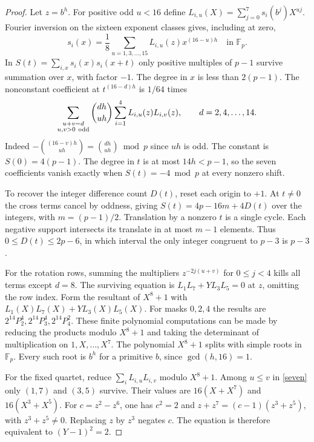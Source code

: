 \documentclass[11pt]{article}
\newcommand{\F}{\mathbb F}
\begin{document}
\begin{proof}
Let $z=b^h$. For positive odd $u<16$ define $L_{i,u}(X)=\sum_{j=0}^7 s_i(b^j)X^{uj}$. Fourier inversion on the sixteen exponent classes gives, including at zero,
\[
 s_i(x)=\frac18\sum_{u=1,3,\ldots,15} L_{i,u}(z)x^{(16-u)h}\quad\text{in }\F_p.
\]
In $S(t)=\sum_{i,x}s_i(x)s_i(x+t)$ only positive multiples of $p-1$ survive summation over $x$, with factor $-1$. The degree in $x$ is less than $2(p-1)$. The nonconstant coefficient at $t^{(16-d)h}$ is $1/64$ times
\begin{equation}\label{seven}
 \sum_{\substack{u+v=d\\ u,v>0\ {\rm odd}}}\binom{dh}{uh}
               \sum_{i=1}^4 L_{i,u}(z)L_{i,v}(z),\qquad d=2,4,\ldots,14.
\end{equation}
Indeed $-\binom{(16-v)h}{uh}=\binom{dh}{uh}\bmod p$ since $uh$ is odd. The constant is $S(0)=4(p-1)$. The degree in $t$ is at most $14h<p-1$, so the seven coefficients vanish exactly when $S(t)=-4\bmod p$ at every nonzero shift.

To recover the integer difference count $D(t)$, reset each origin to $+1$. At $t\ne0$ the cross terms cancel by oddness, giving $S(t)=4p-16m+4D(t)$ over the integers, with $m=(p-1)/2$. Translation by a nonzero $t$ is a single cycle. Each negative support intersects its translate in at most $m-1$ elements. Thus $0\le D(t)\le2p-6$, in which interval the only integer congruent to $p-3$ is $p-3$.

For the rotation rows, summing the multipliers $z^{-2j(u+v)}$ for $0\le j<4$ kills all terms except $d=8$. The surviving equation is $L_1L_7+Y L_3L_5=0$ at $z$, omitting the row index. Form the resultant of $X^8+1$ with $L_1(X)L_7(X)+Y L_3(X)L_5(X)$. For masks $0,2,4$ the results are $2^{14}P_2^4,2^{14}P_3^4,2^{14}P_4^2$. These finite polynomial computations can be made by reducing the products modulo $X^8+1$ and taking the determinant of multiplication on $1,X,\ldots,X^7$. The polynomial $X^8+1$ splits with simple roots in $\F_p$. Every such root is $b^h$ for a primitive $b$, since $\gcd(h,16)=1$.

For the fixed quartet, reduce $\sum_i L_{i,u}L_{i,v}$ modulo $X^8+1$. Among $u\le v$ in \eqref{seven} only $(1,7)$ and $(3,5)$ survive. Their values are $16(X+X^7)$ and $16(X^3+X^5)$. For $c=z^2-z^6$, one has $c^2=2$ and $z+z^7=(c-1)(z^3+z^5)$, with $z^3+z^5\ne0$. Replacing $z$ by $z^3$ negates $c$. The equation is therefore equivalent to $(Y-1)^2=2$.
\end{proof}
\end{document}
